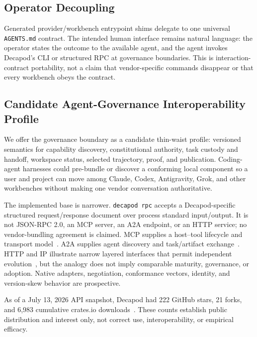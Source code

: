 \subsection{Operator Decoupling}
Generated provider/workbench entrypoint shims delegate to one universal \texttt{AGENTS.md} contract. The intended human interface remains natural language: the operator states the outcome to the available agent, and the agent invokes Decapod's CLI or structured RPC at governance boundaries. This is interaction-contract portability, not a claim that vendor-specific commands disappear or that every workbench obeys the contract.

\subsection{Candidate Agent-Governance Interoperability Profile}
We offer the governance boundary as a candidate thin-waist profile: versioned semantics for capability discovery, constitutional authority, task custody and handoff, workspace status, selected trajectory, proof, and publication. Coding-agent harnesses could pre-bundle or discover a conforming local component so a user and project can move among Claude, Codex, Antigravity, Grok, and other workbenches without making one vendor conversation authoritative.

The implemented base is narrower. \texttt{decapod rpc} accepts a Decapod-specific structured request/response document over process standard input/output. It is not JSON-RPC 2.0, an MCP server, an A2A endpoint, or an HTTP service; no vendor-bundling agreement is claimed. MCP supplies a host--tool lifecycle and transport model~\cite{mcp2025architecture}. A2A supplies agent discovery and task/artifact exchange~\cite{a2a2026spec}. HTTP and IP illustrate narrow layered interfaces that permit independent evolution~\cite{rfc9110http,rfc791ip}, but the analogy does not imply comparable maturity, governance, or adoption. Native adapters, negotiation, conformance vectors, identity, and version-skew behavior are prospective.

As of a July 13, 2026 API snapshot, Decapod had 222 GitHub stars, 21 forks, and 6,983 cumulative crates.io downloads~\cite{github2026decapod,cratesio2026decapod}. These counts establish public distribution and interest only, not correct use, interoperability, or empirical efficacy.


